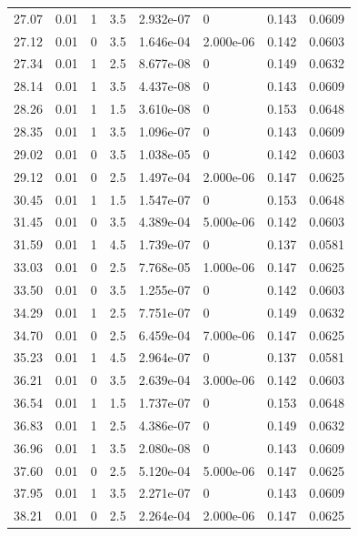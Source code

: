 \documentclass[preview]{standalone}
\begin{document}
{{{\begin{tabular}{L{1.2cm}C{1.2cm} C{0.3cm}C{0.5cm} C{1.4cm}C{1.4cm} C{1.4cm}C{1.4cm}}
  27.07  &  0.01  & 1     & 3.5 &  2.932e-07  & 0  & 0.143 &  0.0609   \\ 
  27.12  &  0.01  & 0     & 3.5 &  1.646e-04  & 2.000e-06  & 0.142 &  0.0603   \\ 
  27.34  &  0.01  & 1     & 2.5 &  8.677e-08  & 0  & 0.149 &  0.0632   \\ 
  28.14  &  0.01  & 1     & 3.5 &  4.437e-08  & 0  & 0.143 &  0.0609   \\ 
  28.26  &  0.01  & 1     & 1.5 &  3.610e-08  & 0  & 0.153 &  0.0648   \\ 
  28.35  &  0.01  & 1     & 3.5 &  1.096e-07  & 0  & 0.143 &  0.0609   \\ 
  29.02  &  0.01  & 0     & 3.5 &  1.038e-05  & 0  & 0.142 &  0.0603   \\ 
  29.12  &  0.01  & 0     & 2.5 &  1.497e-04  & 2.000e-06  & 0.147 &  0.0625   \\ 
  30.45  &  0.01  & 1     & 1.5 &  1.547e-07  & 0  & 0.153 &  0.0648   \\ 
  31.45  &  0.01  & 0     & 3.5 &  4.389e-04  & 5.000e-06  & 0.142 &  0.0603   \\ 
  31.59  &  0.01  & 1     & 4.5 &  1.739e-07  & 0  & 0.137 &  0.0581   \\ 
  33.03  &  0.01  & 0     & 2.5 &  7.768e-05  & 1.000e-06  & 0.147 &  0.0625   \\ 
  33.50  &  0.01  & 0     & 3.5 &  1.255e-07  & 0  & 0.142 &  0.0603   \\ 
  34.29  &  0.01  & 1     & 2.5 &  7.751e-07  & 0  & 0.149 &  0.0632   \\ 
  34.70  &  0.01  & 0     & 2.5 &  6.459e-04  & 7.000e-06  & 0.147 &  0.0625   \\ 
  35.23  &  0.01  & 1     & 4.5 &  2.964e-07  & 0  & 0.137 &  0.0581   \\ 
  36.21  &  0.01  & 0     & 3.5 &  2.639e-04  & 3.000e-06  & 0.142 &  0.0603   \\ 
  36.54  &  0.01  & 1     & 1.5 &  1.737e-07  & 0  & 0.153 &  0.0648   \\ 
  36.83  &  0.01  & 1     & 2.5 &  4.386e-07  & 0  & 0.149 &  0.0632   \\ 
  36.96  &  0.01  & 1     & 3.5 &  2.080e-08  & 0  & 0.143 &  0.0609   \\ 
  37.60  &  0.01  & 0     & 2.5 &  5.120e-04  & 5.000e-06  & 0.147 &  0.0625   \\ 
  37.95  &  0.01  & 1     & 3.5 &  2.271e-07  & 0  & 0.143 &  0.0609   \\ 
  38.21  &  0.01  & 0     & 2.5 &  2.264e-04  & 2.000e-06  & 0.147 &  0.0625   \\ 

\end{tabular}}}}
\end{document}
